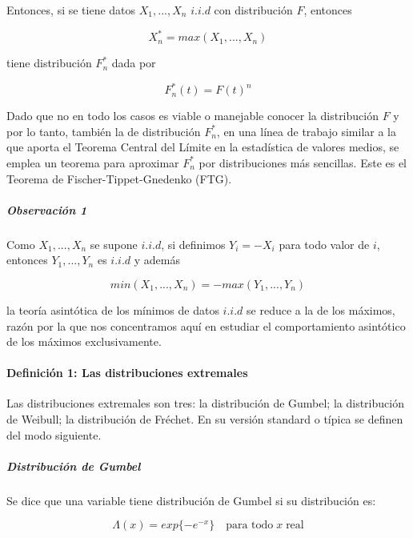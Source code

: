 \documentclass[
  oneside]{article}
\begin{document}
Entonces, si se tiene datos \(X_1,...,X_n\) \(i.i.d\) con distribución
\(F\), entonces

\begin{equation}
X_n^* = max (X_1,...,X_n)
\end{equation}

tiene distribución \(F_n^*\) dada por

\begin{equation}
F_n^* (t)= F(t)^n
\end{equation}

Dado que no en todo los casos es viable o manejable conocer la
distribución \(F\) y por lo tanto, también la de distribución \(F_n^*\),
en una línea de trabajo similar a la que aporta el Teorema Central del
Límite en la estadística de valores medios, se emplea un teorema para
aproximar \(F_n^{*}\) por distribuciones más sencillas. Este es el
Teorema de Fischer-Tippet-Gnedenko (FTG).

\hypertarget{observaciuxf3n-1}{%
\subparagraph{Observación 1}\label{observaciuxf3n-1}}

Como \(X_1,...,X_n\) se supone \(i.i.d\), si definimos \(Y_i = -X_i\)
para todo valor de \(i\), entonces \(Y_1,...,Y_n\) es \(i.i.d\) y además

\begin{equation}
min(X_1,...,X_n) = - max(Y_1,...,Y_n)
\end{equation}

la teoría asintótica de los mínimos de datos \(i.i.d\) se reduce a la de
los máximos, razón por la que nos concentramos aquí en estudiar el
comportamiento asintótico de los máximos exclusivamente.

\hypertarget{definiciuxf3n-1-las-distribuciones-extremales}{%
\paragraph{Definición 1: Las distribuciones
extremales}\label{definiciuxf3n-1-las-distribuciones-extremales}}

Las distribuciones extremales son tres: la distribución de Gumbel; la
distribución de Weibull; la distribución de Fréchet. En su versión
standard o típica se definen del modo siguiente.

\hypertarget{distribuciuxf3n-de-gumbel}{%
\subparagraph{Distribución de Gumbel}\label{distribuciuxf3n-de-gumbel}}

Se dice que una variable tiene distribución de Gumbel si su distribución
es:

\begin{equation}
\Lambda(x) = exp\{-e^{-x}\} \quad\text{para todo}\; x \;\text{real} 
\end{equation}
\end{document}

